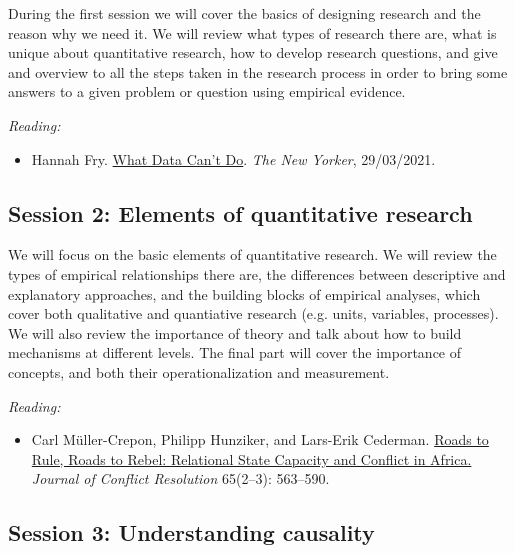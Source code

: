 \documentclass[12pt, a4paper]{article}
\begin{document}
During the first session we will cover the basics of designing research and the reason why we need it. We will review what types of research there are, what is unique about quantitative research, how to develop research questions, and give and overview to all the steps taken in the research process in order to bring some answers to a given problem or question using empirical evidence.

\vspace{15pt}\noindent\textit{Reading:}

\begin{itemize}
  \item Hannah Fry. \href{https://www.newyorker.com/magazine/2021/03/29/what-data-cant-do}{What Data Can't Do}. \textit{The New Yorker}, 29/03/2021.
\end{itemize}


\subsection*{Session 2: Elements of quantitative research}

We will focus on the basic elements of quantitative research. We will review the types of empirical relationships there are, the differences between descriptive and explanatory approaches, and the building blocks of empirical analyses, which cover both qualitative and quantiative research (e.g. units, variables, processes). We will also review the importance of theory and talk about how to build mechanisms at different levels. The final part will cover the importance of concepts, and both their operationalization and measurement.

\vspace{15pt}\noindent\textit{Reading:}

\begin{itemize}
  \item Carl Müller-Crepon, Philipp Hunziker, and Lars-Erik Cederman. \href{https://journals.sagepub.com/doi/10.1177/0022002720963674}{Roads to Rule, Roads to Rebel: Relational State Capacity and Conflict in Africa.} \textit{Journal of Conflict Resolution} 65(2--3): 563--590.
\end{itemize}

\subsection*{Session 3: Understanding causality}
\end{document}
